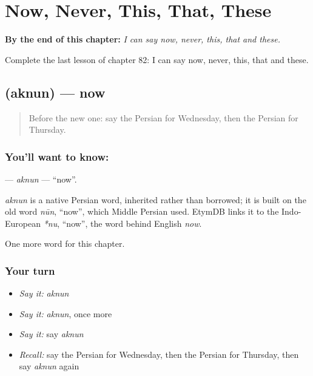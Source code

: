 
\chapter{Now, Never, This, That, These}
\label{ch:fa-now-never-this-that-these}

\begin{chapteropening}
\textbf{By the end of this chapter:} \emph{I can say now, never, this, that and these.}

Complete the last lesson of chapter 82: I can say now, never, this, that and these.
\end{chapteropening}

\section[\texorpdfstring{\fa{اکنون} (aknun)}{اکنون (aknun)}]{ (aknun) — now}

\label{lesson:FA-C82-aknun}



\begin{quote}
Before the new one: say the Persian for Wednesday, then the Persian for Thursday.
\end{quote}

\subsection*{You'll want to know: }
\textbf{} — \emph{aknun} — \textquotedblleft{}now\textquotedblright{}.

\begin{cousinweb}
\emph{aknun} is a native Persian word, inherited rather than borrowed; it is built on the old word \emph{nūn}, \textquotedblleft{}now\textquotedblright{}, which Middle Persian used. EtymDB links it to the Indo-European \emph{*nu}, \textquotedblleft{}now\textquotedblright{}, the word behind English \emph{now}.
\end{cousinweb}

\begin{grammarlens}[title={What you've built}]
One more word for this chapter.
\end{grammarlens}

\subsection*{Your turn}
\begin{itemize}
\raggedright
  \item \emph{Say it:} \emph{aknun}
  \item \emph{Say it:} \emph{aknun}, once more
  \item \emph{Say it:} say \emph{aknun}
  \item \emph{Recall:} say the Persian for Wednesday, then the Persian for Thursday, then say \emph{aknun} again
\end{itemize}

